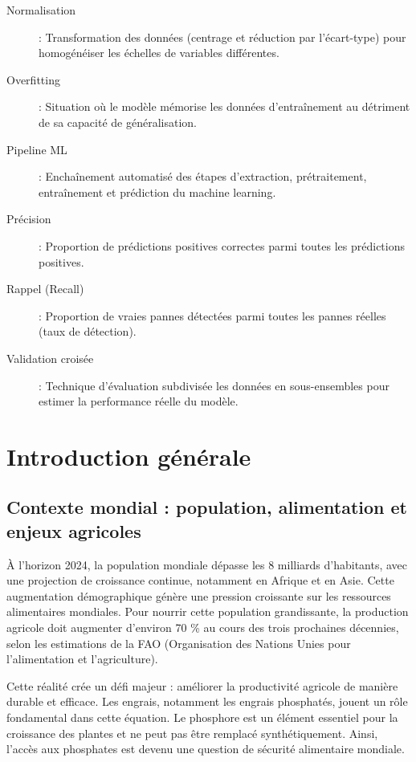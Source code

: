 \documentclass[a4paper,12pt,twoside]{report}
\begin{document}
\begin{description}
\item[Normalisation] : Transformation des données (centrage et réduction par l'écart-type) pour homogénéiser les échelles de variables différentes.

\item[Overfitting] : Situation où le modèle mémorise les données d'entraînement au détriment de sa capacité de généralisation.

\item[Pipeline ML] : Enchaînement automatisé des étapes d'extraction, prétraitement, entraînement et prédiction du machine learning.

\item[Précision] : Proportion de prédictions positives correctes parmi toutes les prédictions positives.

\item[Rappel (Recall)] : Proportion de vraies pannes détectées parmi toutes les pannes réelles (taux de détection).

\item[Validation croisée] : Technique d'évaluation subdivisée les données en sous-ensembles pour estimer la performance réelle du modèle.

\end{description}

\newpage
\tableofcontents

\newpage
\chapter*{Introduction générale}
\thispagestyle{plain}

\section*{Contexte mondial : population, alimentation et enjeux agricoles}

À l'horizon 2024, la population mondiale dépasse les 8 milliards d'habitants, avec une projection de croissance continue, notamment en Afrique et en Asie. Cette augmentation démographique génère une pression croissante sur les ressources alimentaires mondiales. Pour nourrir cette population grandissante, la production agricole doit augmenter d'environ 70 \% au cours des trois prochaines décennies, selon les estimations de la FAO (Organisation des Nations Unies pour l'alimentation et l'agriculture).

Cette réalité crée un défi majeur : améliorer la productivité agricole de manière durable et efficace. Les engrais, notamment les engrais phosphatés, jouent un rôle fondamental dans cette équation. Le phosphore est un élément essentiel pour la croissance des plantes et ne peut pas être remplacé synthétiquement. Ainsi, l'accès aux phosphates est devenu une question de sécurité alimentaire mondiale.
\end{document}
